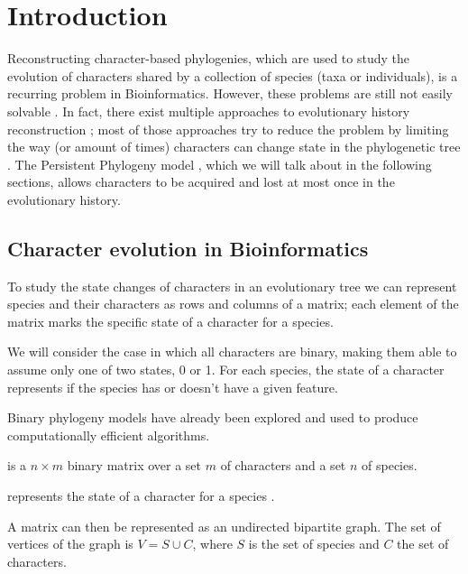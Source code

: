 
\section{Introduction}\label{section:introduction}

Reconstructing character-based phylogenies, which are used to study the evolution of characters shared by a collection of species (taxa or individuals), is a recurring problem in Bioinformatics.
However, these problems are still not easily solvable \cite{DPQ2011}.
In fact, there exist multiple approaches to evolutionary history reconstruction \cite{SD2003, MPL2004, BI2001}; most of those approaches try to reduce the problem by limiting the way (or amount of times) characters can change state in the phylogenetic tree \cite{CS1990, PPptime1994}.
The Persistent Phylogeny model \cite{PPPbin2012, PPPcgraph2016, PPPptime2016}, which we will talk about in the following sections, allows characters to be acquired and lost at most once in the evolutionary history.

\subsection{Character evolution in Bioinformatics}\label{section:character-evolution}

To study the state changes of characters in an evolutionary tree we can represent species and their characters as rows and columns of a matrix; each element of the matrix marks the specific state of a character for a species.

We will consider the case in which all characters are binary, making them able to assume only one of two states, 0 or 1.
For each species, the state of a character represents if the species has or doesn't have a given feature.

Binary phylogeny models have already been explored \cite{PPPbin2012, NPP2007, IDPP2004} and used to produce computationally efficient algorithms.

\begin{definition}\label{definition:m}
  \m{} is a $n \times m$ binary matrix over a set $m$ of characters and a set $n$ of species.

  \m[i][j] represents the state of a character \character[j] for a species \species[i].
\end{definition}

A matrix \m{} can then be represented as an undirected bipartite graph.
The set of vertices of the graph is $V = S \cup C$, where $S$ is the set of species and $C$ the set of characters.


